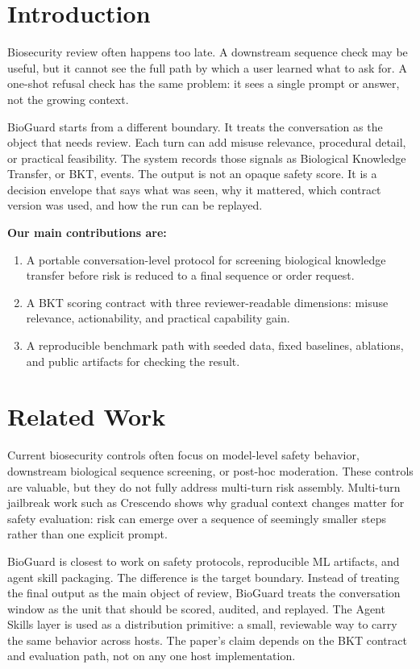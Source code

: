 \documentclass[11pt]{article}
\begin{document}
\vspace{0.25in}

\section{Introduction}

Biosecurity review often happens too late. A downstream sequence check may be useful, but it cannot see the full path by which a user learned what to ask for. A one-shot refusal check has the same problem: it sees a single prompt or answer, not the growing context.

BioGuard starts from a different boundary. It treats the conversation as the object that needs review. Each turn can add misuse relevance, procedural detail, or practical feasibility. The system records those signals as Biological Knowledge Transfer, or BKT, events. The output is not an opaque safety score. It is a decision envelope that says what was seen, why it mattered, which contract version was used, and how the run can be replayed.

\textbf{Our main contributions are:}
\begin{enumerate}[label=\arabic*.]
    \item A portable conversation-level protocol for screening biological knowledge transfer before risk is reduced to a final sequence or order request.
    \item A BKT scoring contract with three reviewer-readable dimensions: misuse relevance, actionability, and practical capability gain.
    \item A reproducible benchmark path with seeded data, fixed baselines, ablations, and public artifacts for checking the result.
\end{enumerate}

\section{Related Work}

Current biosecurity controls often focus on model-level safety behavior, downstream biological sequence screening, or post-hoc moderation. These controls are valuable, but they do not fully address multi-turn risk assembly. Multi-turn jailbreak work such as Crescendo shows why gradual context changes matter for safety evaluation: risk can emerge over a sequence of seemingly smaller steps rather than one explicit prompt.

BioGuard is closest to work on safety protocols, reproducible ML artifacts, and agent skill packaging. The difference is the target boundary. Instead of treating the final output as the main object of review, BioGuard treats the conversation window as the unit that should be scored, audited, and replayed. The Agent Skills layer is used as a distribution primitive: a small, reviewable way to carry the same behavior across hosts. The paper's claim depends on the BKT contract and evaluation path, not on any one host implementation.
\end{document}
